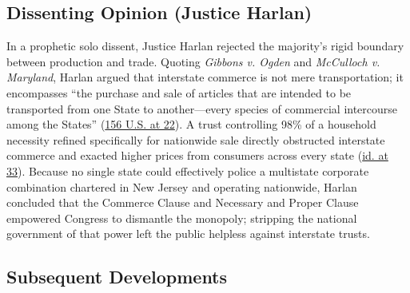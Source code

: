 \documentclass[12pt]{article}
\begin{document}
\subsection{Dissenting Opinion (Justice Harlan)}

In a prophetic solo dissent, Justice Harlan rejected the majority's rigid boundary between production and trade. Quoting \textit{Gibbons v. Ogden} and \textit{McCulloch v. Maryland}, Harlan argued that interstate commerce is not mere transportation; it encompasses ``the purchase and sale of articles that are intended to be transported from one State to another---every species of commercial intercourse among the States'' (\href{https://www.law.cornell.edu/constitution-conan/article-1/section-8/clause-3/commerce-among-the-several-states}{156 U.S. at 22}). A trust controlling 98\% of a household necessity refined specifically for nationwide sale directly obstructed interstate commerce and exacted higher prices from consumers across every state (\href{https://www.law.cornell.edu/constitution-conan/article-1/section-8/clause-3/commerce-among-the-several-states}{id. at 33}). Because no single state could effectively police a multistate corporate combination chartered in New Jersey and operating nationwide, Harlan concluded that the Commerce Clause and Necessary and Proper Clause empowered Congress to dismantle the monopoly; stripping the national government of that power left the public helpless against interstate trusts.

\subsection{Subsequent Developments}
\end{document}

